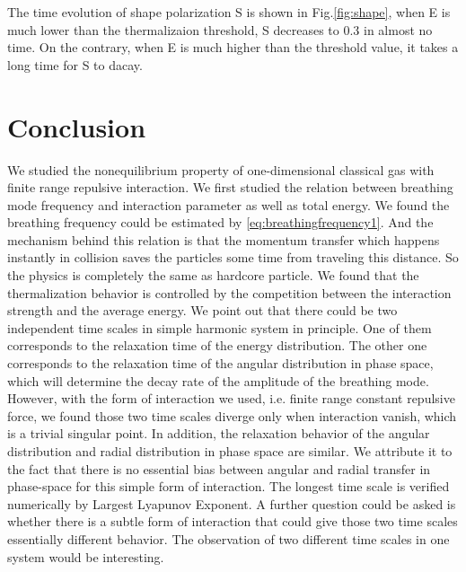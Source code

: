 \documentclass[aps,pre,twocolumn,groupedaddress]{revtex4-1}
\begin{document}
The time evolution of shape polarization S is shown in Fig.\ref{fig:shape}, when E is much lower than the thermalizaion threshold, S decreases to 0.3 in almost no time. On the contrary, when E is much higher than the threshold value, it takes a long time for S to dacay.


\section{Conclusion}
We studied the nonequilibrium property of one-dimensional classical gas with finite range repulsive interaction. We first studied the relation between breathing mode frequency and interaction parameter as well as total energy. We found the breathing frequency could be estimated by \ref{eq:breathingfrequency1}. And the mechanism behind this relation is that the momentum transfer which happens instantly in collision saves the particles some time from traveling this distance. So the physics is completely the same as hardcore particle.
We found that the thermalization behavior is controlled by the competition between the interaction strength and the average energy. We point out that there could be two independent time scales in simple harmonic system in principle. One of them corresponds to the relaxation time of the energy distribution. The other one corresponds to the relaxation time of the angular distribution in phase space, which will determine the decay rate of the amplitude of the breathing mode. However, with the form of interaction we used, i.e. finite range constant repulsive force, we found those two time scales diverge only when interaction vanish, which is a trivial singular point. In addition, the relaxation behavior of the angular distribution and radial distribution in phase space are similar. We attribute it to the fact that there is no essential bias between angular and radial transfer in phase-space for this simple form of interaction. The longest time scale is verified numerically by Largest Lyapunov Exponent. A further question could be asked is whether there is a subtle form of interaction that could give those two time scales essentially different behavior. The observation of two different time scales in one system would be interesting.
\end{document}
